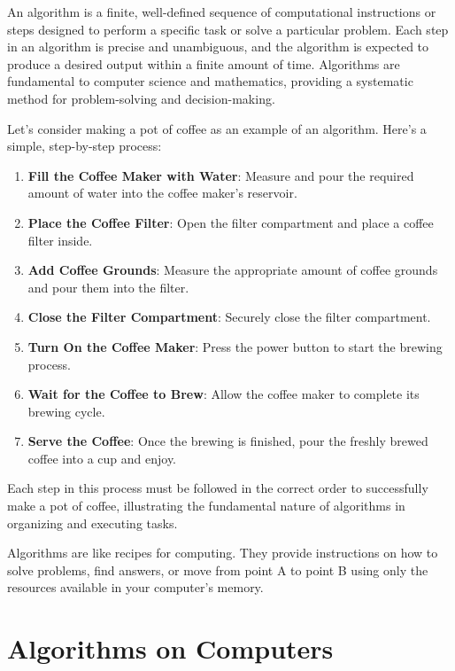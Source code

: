 \documentclass[
  letterpaper,
  DIV=11,
  numbers=noendperiod]{scrreprt}
\providecommand{\tightlist}{%
  \setlength{\itemsep}{0pt}\setlength{\parskip}{0pt}}\usepackage{longtable,booktabs,array}
\begin{document}
An algorithm is a finite, well-defined sequence of computational
instructions or steps designed to perform a specific task or solve a
particular problem. Each step in an algorithm is precise and
unambiguous, and the algorithm is expected to produce a desired output
within a finite amount of time. Algorithms are fundamental to computer
science and mathematics, providing a systematic method for
problem-solving and decision-making.

Let's consider making a pot of coffee as an example of an algorithm.
Here's a simple, step-by-step process:

\begin{enumerate}
\def\labelenumi{\arabic{enumi}.}
\tightlist
\item
  \textbf{Fill the Coffee Maker with Water}: Measure and pour the
  required amount of water into the coffee maker's reservoir.
\item
  \textbf{Place the Coffee Filter}: Open the filter compartment and
  place a coffee filter inside.
\item
  \textbf{Add Coffee Grounds}: Measure the appropriate amount of coffee
  grounds and pour them into the filter.
\item
  \textbf{Close the Filter Compartment}: Securely close the filter
  compartment.
\item
  \textbf{Turn On the Coffee Maker}: Press the power button to start the
  brewing process.
\item
  \textbf{Wait for the Coffee to Brew}: Allow the coffee maker to
  complete its brewing cycle.
\item
  \textbf{Serve the Coffee}: Once the brewing is finished, pour the
  freshly brewed coffee into a cup and enjoy.
\end{enumerate}

Each step in this process must be followed in the correct order to
successfully make a pot of coffee, illustrating the fundamental nature
of algorithms in organizing and executing tasks.

Algorithms are like recipes for computing. They provide instructions on
how to solve problems, find answers, or move from point A to point B
using only the resources available in your computer's memory.

\hypertarget{algorithms-on-computers}{%
\section{Algorithms on Computers}\label{algorithms-on-computers}}
\end{document}
